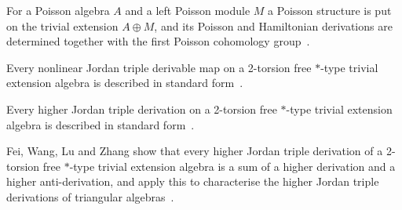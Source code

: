 For a Poisson algebra $A$ and a left Poisson module $M$ a Poisson structure is put on the trivial extension $A \oplus M$, and its Poisson and Hamiltonian derivations are determined together with the first Poisson cohomology group~\cite{WlPoissonDerivationsAnd2019}.

Every nonlinear Jordan triple derivable map on a 2-torsion free $*$-type trivial extension algebra is described in standard form~\cite{WlNonlinearJordanTriple2024}.

Every higher Jordan triple derivation on a 2-torsion free $*$-type trivial extension algebra is described in standard form~\cite{WlHigherJordanTriple2024}.

Fei, Wang, Lu and Zhang show that every higher Jordan triple derivation of a 2-torsion free $*$-type trivial extension algebra is a sum of a higher derivation and a higher anti-derivation, and apply this to characterise the higher Jordan triple derivations of triangular algebras~\cite{WlHigherJordanTripleDerivationsO2024}.
